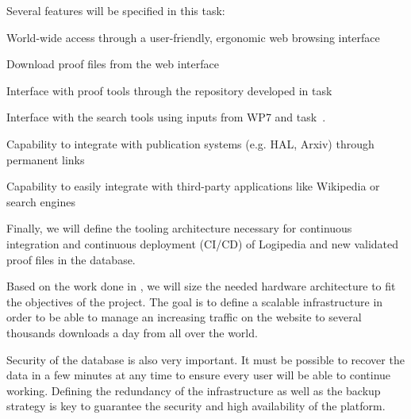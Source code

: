 \begin{workpackage}[id=access,type=RTD,
  short=Access,%
  title={Access},
  lead=Irt,IrtRM=23,OcaRM=6,EduRM=12,InrRM=18]
\begin{tasklist}
\begin{task}[id=archi,
      title=Defining the functional and software architecture,
      lead=Irt,IrtRM=3]
    Several features will be specified in this task:
    \begin{compactitem}
    \item World-wide access through a user-friendly, ergonomic web
      browsing interface
    \item Download proof files from the web interface
    \item Interface with proof tools through the repository developed
      in task~
    \item Interface with the search tools using inputs from WP7 and
      task~.
    \item Capability to integrate with publication systems (e.g. HAL,
      Arxiv) through permanent links
    \item Capability to easily integrate with third-party applications
      like Wikipedia or search engines
    \end{compactitem}

    Finally, we will define the tooling architecture necessary for
    continuous integration and continuous deployment (CI/CD) of
    Logipedia and new validated proof files in the database.
  \end{task}

  \begin{task}[id=infra,
      title=Defining the hardware architecture for the infrastructure,
      lead=Irt,IrtRM=1]
    Based on the work done in , we will
    size the needed hardware architecture to fit the objectives of the
    project. The goal is to define a scalable infrastructure in order
    to be able to manage an increasing traffic on the website to
    several thousands downloads a day from all over the world.

    Security of the database is also very important. It must be
    possible to recover the data in a few minutes at any time to
    ensure every user will be able to continue working. Defining the
    redundancy of the infrastructure as well as the backup strategy is
    key to guarantee the security and high availability of the
    platform.


\end{task}
\end{tasklist}
\end{workpackage}

